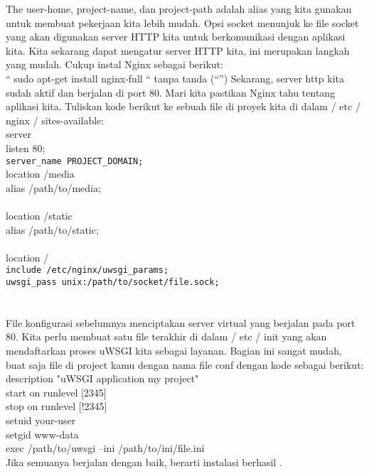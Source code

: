 The user-home, project-name, dan project-path adalah alias yang kita gunakan untuk membuat pekerjaan kita lebih mudah. Opsi socket menunjuk ke file socket yang akan digunakan server HTTP kita untuk berkomunikasi dengan aplikasi kita.
Kita sekarang dapat mengatur server HTTP kita, ini merupakan langkah yang mudah. Cukup instal Nginx sebagai berikut:\\
“ sudo apt-get install nginx-full “ tanpa tanda (“”)
Sekarang, server http kita sudah aktif dan berjalan di port 80. Mari kita pastikan Nginx tahu tentang aplikasi kita. Tuliskan kode berikut ke sebuah file di proyek kita di dalam / etc / nginx / sites-available:\\
server {\\
listen 80;\\
\verb|server_name PROJECT_DOMAIN;|\\
location /media {\\
alias /path/to/media;\\
}\\
location /static {\\
alias /path/to/static;\\
}\\
location / {\\
\verb|include /etc/nginx/uwsgi_params;|\\
\verb|uwsgi_pass unix:/path/to/socket/file.sock;|\\
}\\
}\\
File konfigurasi sebelumnya menciptakan server virtual yang berjalan pada port 80. Kita perlu membuat satu file terakhir di dalam / etc / init yang akan mendaftarkan proses uWSGI kita sebagai layanan. Bagian ini sangat mudah, buat saja file di project kamu dengan nama file conf dengan kode sebagai berikut:\\
description "uWSGI application my project"\\
start on runlevel [2345]\\
stop on runlevel [!2345]\\
setuid your-user\\
setgid www-data\\
exec /path/to/uwsgi --ini /path/to/ini/file.ini\\
Jika semuanya berjalan dengan baik, berarti instalasi berhasil \cite{maia2015building}.\\












